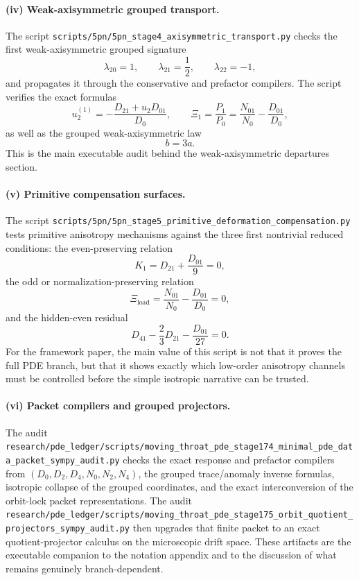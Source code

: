 \documentclass[11pt]{article}
\theoremstyle{definition}
\newcommand{\XiOne}{\ensuremath{\Xi_1}}
\begin{document}
\paragraph{(iv) Weak-axisymmetric grouped transport.}
The script
\nolinkurl{scripts/5pn/5pn_stage4_axisymmetric_transport.py}
checks the first weak-axisymmetric grouped signature
\[
 \lambda_{20}=1,
 \qquad
 \lambda_{21}=\frac12,
 \qquad
 \lambda_{22}=-1,
\]
and propagates it through the conservative and prefactor compilers. The script verifies the exact formulas
\[
 u_2^{(1)}=-\frac{D_{21}+u_2 D_{01}}{D_0},
 \qquad
 \XiOne=\frac{P_1}{P_0}=\frac{N_{01}}{N_0}-\frac{D_{01}}{D_0},
\]
as well as the grouped weak-axisymmetric law
\[
 b=3a.
\]
This is the main executable audit behind the weak-axisymmetric departures section.

\paragraph{(v) Primitive compensation surfaces.}
The script
\nolinkurl{scripts/5pn/5pn_stage5_primitive_deformation_compensation.py}
tests primitive anisotropy mechanisms against the three first nontrivial reduced conditions: the even-preserving relation
\[
 K_1=D_{21}+\frac{D_{01}}{9}=0,
\]
the odd or normalization-preserving relation
\[
 \Xi_{\mathrm{load}}=\frac{N_{01}}{N_0}-\frac{D_{01}}{D_0}=0,
\]
and the hidden-even residual
\[
 D_{41}-\frac23 D_{21}-\frac{D_{01}}{27}=0.
\]
For the framework paper, the main value of this script is not that it proves the full PDE branch, but that it shows exactly which low-order anisotropy channels must be controlled before the simple isotropic narrative can be trusted.

\paragraph{(vi) Packet compilers and grouped projectors.}
The audit
\nolinkurl{research/pde_ledger/scripts/moving_throat_pde_stage174_minimal_pde_data_packet_sympy_audit.py}
checks the exact response and prefactor compilers from
\((D_0,D_2,D_4,N_0,N_2,N_4)\), the grouped trace/anomaly inverse formulas, isotropic collapse of the grouped coordinates, and the exact interconversion of the orbit-lock packet representations. The audit
\nolinkurl{research/pde_ledger/scripts/moving_throat_pde_stage175_orbit_quotient_projectors_sympy_audit.py}
then upgrades that finite packet to an exact quotient-projector calculus on the microscopic drift space. These artifacts are the executable companion to the notation appendix and to the discussion of what remains genuinely branch-dependent.
\end{document}

